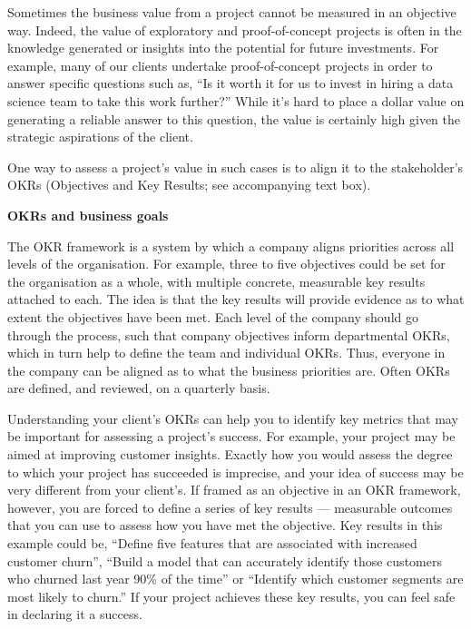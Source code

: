 \documentclass[]{book}
\begin{document}
Sometimes the business value from a project cannot be measured in an
objective way. Indeed, the value of exploratory and proof-of-concept
projects is often in the knowledge generated or insights into the
potential for future investments. For example, many of our clients
undertake proof-of-concept projects in order to answer specific
questions such as, ``Is it worth it for us to invest in hiring a data
science team to take this work further?'' While it's hard to place a
dollar value on generating a reliable answer to this question, the value
is certainly high given the strategic aspirations of the client.

One way to assess a project's value in such cases is to align it to the
stakeholder's OKRs (Objectives and Key Results; see accompanying text
box).

\begin{infobox}

\textbf{OKRs and business goals}

The OKR framework is a system by which a company aligns priorities
across all levels of the organisation. For example, three to five
objectives could be set for the organisation as a whole, with multiple
concrete, measurable key results attached to each. The idea is that the
key results will provide evidence as to what extent the objectives have
been met. Each level of the company should go through the process, such
that company objectives inform departmental OKRs, which in turn help to
define the team and individual OKRs. Thus, everyone in the company can
be aligned as to what the business priorities are. Often OKRs are
defined, and reviewed, on a quarterly basis.

\end{infobox}

Understanding your client's OKRs can help you to identify key metrics
that may be important for assessing a project's success. For example,
your project may be aimed at improving customer insights. Exactly how
you would assess the degree to which your project has succeeded is
imprecise, and your idea of success may be very different from your
client's. If framed as an objective in an OKR framework, however, you
are forced to define a series of key results --- measurable outcomes
that you can use to assess how you have met the objective. Key results
in this example could be, ``Define five features that are associated
with increased customer churn'', ``Build a model that can accurately
identify those customers who churned last year 90\% of the time'' or
``Identify which customer segments are most likely to churn.'' If your
project achieves these key results, you can feel safe in declaring it a
success.
\end{document}
